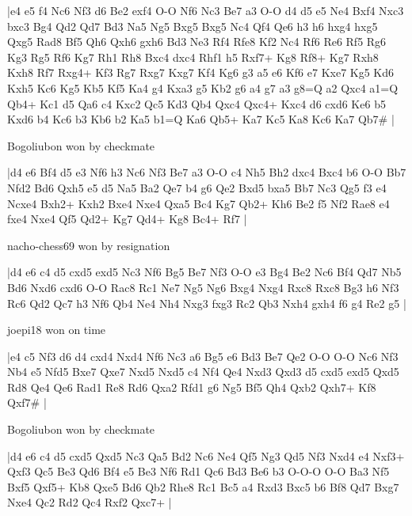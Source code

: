 \makegametitle
|e4 e5 f4 Nc6 Nf3 d6 Be2 exf4 O-O Nf6 Nc3 Be7 a3 O-O d4 d5 e5 Ne4 Bxf4 Nxc3 bxc3 Bg4 Qd2 Qd7 Bd3 Na5 Ng5 Bxg5 Bxg5 Nc4 Qf4 Qe6 h3 h6 hxg4 hxg5 Qxg5 Rad8 Bf5 Qh6 Qxh6 gxh6 Bd3 Ne3 Rf4 Rfe8 Kf2 Nc4 Rf6 Re6 Rf5 Rg6 Kg3 Rg5 Rf6 Kg7 Rh1 Rh8 Bxc4 dxc4 Rhf1 h5 Rxf7+ Kg8 Rf8+ Kg7 Rxh8 Kxh8 Rf7 Rxg4+ Kf3 Rg7 Rxg7 Kxg7 Kf4 Kg6 g3 a5 e6 Kf6 e7 Kxe7 Kg5 Kd6 Kxh5 Kc6 Kg5 Kb5 Kf5 Ka4 g4 Kxa3 g5 Kb2 g6 a4 g7 a3 g8=Q a2 Qxc4 a1=Q Qb4+ Kc1 d5 Qa6 c4 Kxc2 Qc5 Kd3 Qb4 Qxc4 Qxc4+ Kxc4 d6 cxd6 Ke6 b5 Kxd6 b4 Kc6 b3 Kb6 b2 Ka5 b1=Q Ka6 Qb5+ Ka7 Kc5 Ka8 Kc6 Ka7 Qb7\#  |

\showboard

Bogoliubon won by checkmate

\makegametitle
|d4 e6 Bf4 d5 e3 Nf6 h3 Nc6 Nf3 Be7 a3 O-O c4 Nh5 Bh2 dxc4 Bxc4 b6 O-O Bb7 Nfd2 Bd6 Qxh5 e5 d5 Na5 Ba2 Qe7 b4 g6 Qe2 Bxd5 bxa5 Bb7 Nc3 Qg5 f3 e4 Ncxe4 Bxh2+ Kxh2 Bxe4 Nxe4 Qxa5 Bc4 Kg7 Qb2+ Kh6 Be2 f5 Nf2 Rae8 e4 fxe4 Nxe4 Qf5 Qd2+ Kg7 Qd4+ Kg8 Bc4+ Rf7  |

\showboard

nacho-chess69 won by resignation

\makegametitle
|d4 e6 c4 d5 cxd5 exd5 Nc3 Nf6 Bg5 Be7 Nf3 O-O e3 Bg4 Be2 Nc6 Bf4 Qd7 Nb5 Bd6 Nxd6 cxd6 O-O Rac8 Rc1 Ne7 Ng5 Ng6 Bxg4 Nxg4 Rxc8 Rxc8 Bg3 h6 Nf3 Rc6 Qd2 Qc7 h3 Nf6 Qb4 Ne4 Nh4 Nxg3 fxg3 Rc2 Qb3 Nxh4 gxh4 f6 g4 Re2 g5  |

\showboard

joepi18 won on time

\makegametitle
|e4 c5 Nf3 d6 d4 cxd4 Nxd4 Nf6 Nc3 a6 Bg5 e6 Bd3 Be7 Qe2 O-O O-O Nc6 Nf3 Nb4 e5 Nfd5 Bxe7 Qxe7 Nxd5 Nxd5 c4 Nf4 Qe4 Nxd3 Qxd3 d5 cxd5 exd5 Qxd5 Rd8 Qe4 Qe6 Rad1 Re8 Rd6 Qxa2 Rfd1 g6 Ng5 Bf5 Qh4 Qxb2 Qxh7+ Kf8 Qxf7\#  |

\showboard

Bogoliubon won by checkmate

\makegametitle
|d4 e6 c4 d5 cxd5 Qxd5 Nc3 Qa5 Bd2 Nc6 Ne4 Qf5 Ng3 Qd5 Nf3 Nxd4 e4 Nxf3+ Qxf3 Qc5 Be3 Qd6 Bf4 e5 Be3 Nf6 Rd1 Qc6 Bd3 Be6 b3 O-O-O O-O Ba3 Nf5 Bxf5 Qxf5+ Kb8 Qxe5 Bd6 Qb2 Rhe8 Rc1 Bc5 a4 Rxd3 Bxc5 b6 Bf8 Qd7 Bxg7 Nxe4 Qc2 Rd2 Qc4 Rxf2 Qxc7+  |

